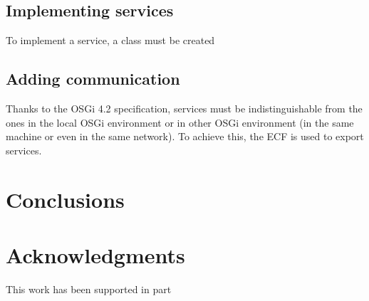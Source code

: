 \documentclass{sig-alternate}
\begin{document}
\subsection{Implementing services}
To implement a service, a class must be created

\subsection{Adding communication}
Thanks to the OSGi 4.2 specification, services must be indistinguishable from the ones in the local OSGi environment or in other OSGi environment (in the same machine or even in the same network). To achieve this, the ECF is used to export services.


\section{Conclusions}
\label{sec:conclusions}


\section{Acknowledgments}
This work has been supported in part %

%



\end{document}
